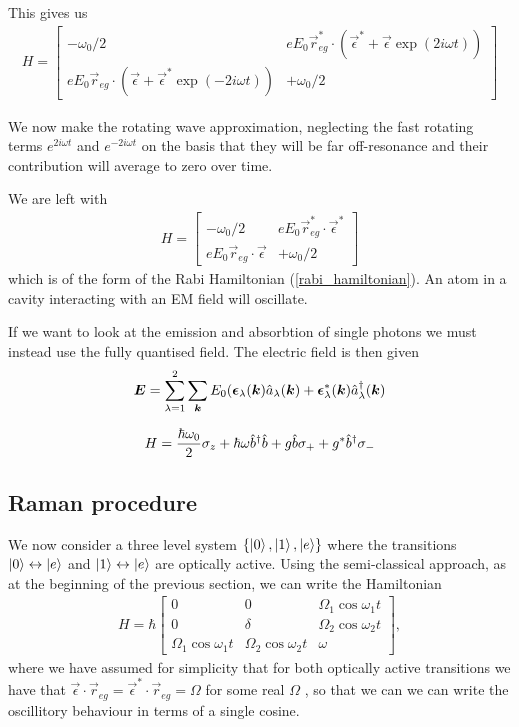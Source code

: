 This gives us
\begin{align}
  H =
  \begin{bmatrix}
    -\omega_0/2 & eE_0\vec{r}_{eg}^*\cdot(\vec{\epsilon}^* + \vec{\epsilon}\exp(2i\omega t)) \\
    eE_0\vec{r}_{eg}\cdot(\vec{\epsilon} + \vec{\epsilon}^*\exp(-2i\omega t)) & +\omega_0/2
  \end{bmatrix}
\end{align}

We now make the rotating wave approximation, neglecting the fast rotating terms $e^{2i\omega t}$ and $e^{-2i\omega t}$ on the basis that they will be far off-resonance and their contribution will average to zero over time. 

We are left with
\begin{align}
  H =
  \begin{bmatrix}
    -\omega_0/2 & eE_0\vec{r}_{eg}^*\cdot\vec{\epsilon}^* \\
    eE_0\vec{r}_{eg}\cdot\vec{\epsilon} & +\omega_0/2
  \end{bmatrix}
\end{align}
which is of the form of the Rabi Hamiltonian (\ref{rabi_hamiltonian}). An atom in a cavity interacting with an EM field will oscillate.

If we want to look at the emission and absorbtion of single photons we must instead use the fully quantised field. The electric field is then given 
\begin{align}
  {\boldsymbol{E}} = \sum_{\lambda = 1}^2 \sum_{{\boldsymbol{k}}} E_0 ({\boldsymbol{\epsilon}}_\lambda({\boldsymbol{k}})\hat{a}_\lambda({\boldsymbol{k}})+ {\boldsymbol{\epsilon}}^*_\lambda({\boldsymbol{k}})\hat{a}^\dagger_\lambda({\boldsymbol{k}})
\end{align}



\begin{align}
  H = \frac{\hbar \omega_0}{2} \mathbf{\sigma}_z + \hbar \omega \hat{b}^\dagger\hat{b} + g\hat{b} \mathbf{\sigma}_{+} + g^{*}\hat{b}^\dagger \mathbf{\sigma}_{-}
\end{align}

\subsection{Raman procedure}

We now consider a three level system $\{\left\vert0\right\rangle, \left\vert1\right\rangle, \left\vert e\right\rangle\}$ where the transitions $\left\vert0\right\rangle \leftrightarrow \left\vert e\right\rangle$ and $\left\vert1\right\rangle \leftrightarrow \left\vert e\right\rangle$ are optically active. Using the semi-classical approach, as at the beginning of the previous section, we can write the Hamiltonian
\begin{align}
  H=\hbar
  \begin{bmatrix}
    0 & 0 & \Omega_1 \cos\omega_1 t \\
    0 & \delta & \Omega_2 \cos\omega_2 t \\
    \Omega_1 \cos\omega_1 t & \Omega_2 \cos\omega_2 t & \omega
  \end{bmatrix},
\end{align}
where we have assumed for simplicity that for both optically active transitions we have that $\vec{\epsilon}\cdot \vec{r}_{eg} = \vec{\epsilon}^*\cdot \vec{r}_{eg} = \Omega$ for some real $\Omega$ , so that we can we can write the oscillitory behaviour in terms of a single cosine.

